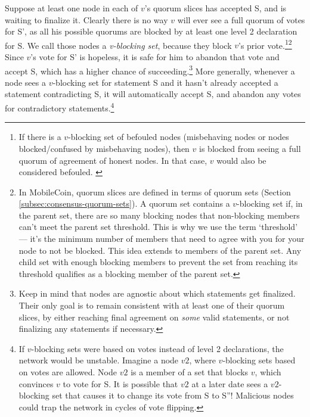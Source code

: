 Suppose at least one node in each of $v$'s quorum slices has accepted S, and is waiting to finalize it. Clearly there is no way $v$ will ever see a full quorum of votes for S', as all his possible quorums are blocked by at least one level 2 declaration for S. We call those nodes a {\em v-blocking set}, because they block $v$'s prior vote.\footnote{If there is a $v$-blocking set of befouled nodes (misbehaving nodes or nodes blocked/confused by misbehaving nodes), then $v$ is blocked from seeing a full quorum of agreement of honest nodes. In that case, $v$ would also be considered befouled. \cite{stellar-consensus-protocol}}\footnote{\label{footnote:v-blocking-quorum-sets}In MobileCoin, quorum slices are defined in terms of quorum sets (Section \ref{subsec:consensus-quorum-sets}). A quorum set contains a $v$-blocking set if, in the parent set, there are so many blocking nodes that non-blocking members can't meet the parent set threshold. This is why we use the term `threshold' --- it's the minimum number of members that need to agree with you for your node to not be blocked. This idea extends to members of the parent set. Any child set with enough blocking members to prevent the set from reaching its threshold qualifies as a blocking member of the parent set.} Since $v$'s vote for S' is hopeless, it is safe for him to abandon that vote and accept S, which has a higher chance of succeeding.\footnote{Keep in mind that nodes are agnostic about which statements get finalized. Their only goal is to remain consistent with at least one of their quorum slices, by either reaching final agreement on {\em some} valid statements, or not finalizing any statements if necessary.} More generally, whenever a node sees a $v$-blocking set for statement S and it hasn't already accepted a statement contradicting S, it will automatically accept S, and abandon any votes for contradictory statements.\footnote{If $v$-blocking sets were based on votes instead of level 2 declarations, the network would be unstable. Imagine a node $v2$, where $v$-blocking sets based on votes are allowed. Node $v2$ is a member of a set that blocks $v$, which convinces $v$ to vote for S. It is possible that $v2$ at a later date sees a $v2$-blocking set that causes it to change its vote from S to S''! Malicious nodes could trap the network in cycles of vote flipping.}

